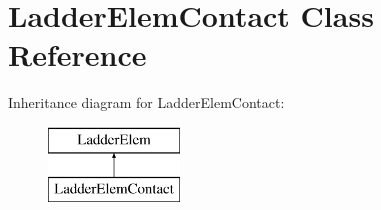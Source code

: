 \hypertarget{class_ladder_elem_contact}{\section{Ladder\-Elem\-Contact Class Reference}
\label{class_ladder_elem_contact}
}
Inheritance diagram for Ladder\-Elem\-Contact\-:\begin{figure}[H]
\begin{center}
\leavevmode
\includegraphics[height=2.000000cm]{class_ladder_elem_contact}
\end{center}
\end{figure}
